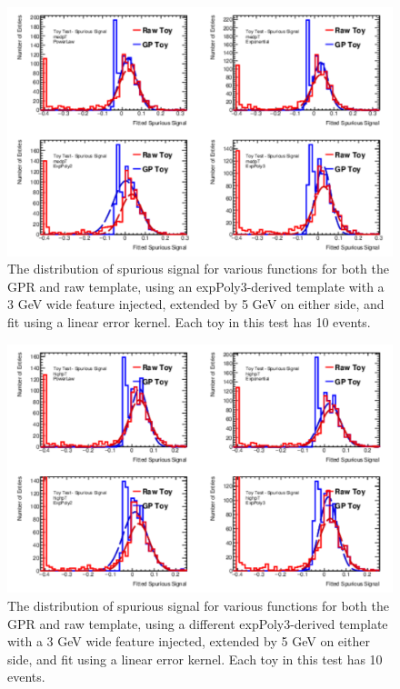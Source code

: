\begin{figure} 
\begin{center}
  \includegraphics[width=\textwidth]{figures/background/gpr/validation/linear/ToyTest_FitSigVals_medpT_10_Sig}   
\caption{The distribution of spurious signal for various functions for both the GPR and raw template, using an expPoly3-derived template with a 3 GeV wide feature injected, extended by 5 GeV on either side, and fit using a linear error kernel. Each toy in this test has 10 events.}
\label{fig:linearkernel_medpt_10_Sig}
\end{center}
\end{figure}

\begin{figure} 
\begin{center}
  \includegraphics[width=\textwidth]{figures/background/gpr/validation/linear/ToyTest_FitSigVals_highpT_10_Sig}   
\caption{The distribution of spurious signal for various functions for both the GPR and raw template, using a different expPoly3-derived template with a 3 GeV wide feature injected, extended by 5 GeV on either side, and fit using a linear error kernel. Each toy in this test has 10 events.}
\label{fig:linearkernel_highpt_10_Sig}
\end{center}
\end{figure}

